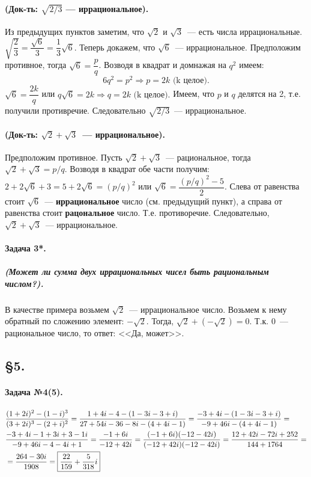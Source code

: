 \documentclass[a4paper,12pt]{report}
\begin{document}
\paragraph{(Док-ть: $ \sqrt{2/3} $ --- иррациональное).}
Из предыдущих пунктов заметим, что $ \sqrt{2} $ и
$ \sqrt{3} $~--- есть числа иррациональные.
$ \sqrt{\dfrac{2}{3}}=\dfrac{\sqrt{6}}{3}=\dfrac{1}{3}\sqrt{6} $.
Теперь докажем, что $ \sqrt{6} $~--- иррациональное. 
Предположим противное, тогда $ \sqrt{6}=\dfrac{p}{q} $.
Возводя в квадрат и домнажая на $ q^2 $ имеем: $$ 6q^2=p^2 
\Rightarrow p=2k \text{ (k целое).}$$ 
$ \sqrt{6}=\dfrac{2k}{q} $ или 
$ q\sqrt{6}=2k \Rightarrow q=2k\text{ (k целое).}$  
Имеем, что $ p $ и $ q $ делятся на 2, т.е. получили противречие.
Следовательно $ \sqrt{2/3} $~--- иррациональное.

\paragraph{(Док-ть: $ \sqrt{2} + \sqrt{3} $~--- иррациональное).}
Предположим противное.
Пусть $ \sqrt{2} + \sqrt{3} $~--- рациональное, тогда
$ \sqrt{2} + \sqrt{3} = p/q $. Возводя в квадрат обе части получим: 
$ 2 + 2\sqrt{6} + 3 = 
5 + 2\sqrt{6} = (p/q)^2 $ или 
$ \sqrt{6}= \dfrac{(p/q)^2 - 5}{2} $.  
Слева от равенства стоит $ \sqrt{6} $~--- \textbf{иррациональное} 
число (см. предыдущий пункт), а справа от равенства 
стоит \textbf{рацональное} число. Т.е. противоречие.
Следовательно, $ \sqrt{2} + \sqrt{3} $~--- иррациональное.

\paragraph{Задача 3*.}
\subparagraph{(Может ли сумма двух иррациональных чисел быть рациональным числом?).} 
В качестве примера возьмем $ \sqrt{2} $~--- иррациональное число.
Возьмем к нему обратный по сложению элемент: $ -\sqrt{2} $. Тогда,
$ \sqrt{2} + (-\sqrt{2}) = 0 $. Т.к. 0~--- рациональное число, то 
ответ: <<Да, может>>.

\subsection*{\S5.\\}

\paragraph{Задача №4(5).}

\begin{align*}
	&\dfrac{(1+2i)^2-(1-i)^3}{(3+2i)^3-(2+i)^2}=
	\dfrac{1+4i-4-(1-3i-3+i)}{27+54i-36-8i-(4+4i-1)}=
	\dfrac{-3+4i-(1-3i-3+i)}{-9+46i-(4+4i-1)}=\\
	&\dfrac{-3+4i-1+3i+3-1i}{-9+46i-4-4i+1}=
	\dfrac{-1+6i}{-12+42i}=
	\dfrac{(-1+6i)(-12-42i)}{(-12+42i)(-12-42i)}=
	\dfrac{12+42i-72i+252}{144+1764}=\\
	&=\dfrac{264-30i}{1908}=
	\fbox{$ \dfrac{22}{159}+\dfrac{5}{318}i $} 
\end{align*}
\end{document}
